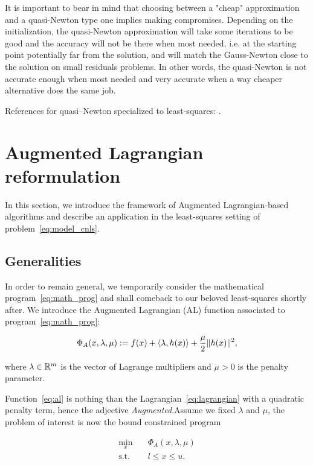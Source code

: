 \documentclass[10pt]{article}
\numberwithin{equation}{section}
\begin{document}
	 It is important to bear in mind that choosing between a "cheap" approximation and a quasi-Newton type one implies making compromises. Depending on the initialization, the quasi-Newton approximation will take some iterations to be good and the accuracy will not be there when most needed, i.e. at the starting point potentially far from the solution, and will match the Gauss-Newton close to the solution on small residuals problems. In other words, the quasi-Newton is not accurate enough when most needed and very accurate when a way cheaper alternative does the same job.
	 
	 References for quasi--Newton specialized to least-squares: \cite{dennisetal:1981,yabetakahashi}.
	 
	 \section{Augmented Lagrangian reformulation}\label{sec:about_al}
	 
	 In this section, we introduce the framework of Augmented Lagrangian-based algorithms and describe an application in the least-squares setting of problem~\eqref{eq:model_cnls}.
	 
	 \subsection{Generalities}
	 
	 In order to remain general, we temporarily consider the mathematical program~\eqref{eq:math_prog} and shall comeback to our beloved least-squares shortly after. 
	 We introduce the Augmented Lagrangian (AL) function associated to program~\eqref{eq:math_prog}:
	 
	 \begin{equation}
	 	\label{eq:al}
	 	\Phi_A(x,\lambda,\mu) := f(x) + \left\langle {\lambda} , {h(x)} \right\rangle + \dfrac{\mu}{2} \|h(x)\|^2,
	 \end{equation}
	 
	 where $\lambda\in {\mathbb{R}}^m$ is the vector of Lagrange multipliers and $\mu > 0$ is the penalty parameter.
	 
	 Function~\eqref{eq:al} is nothing than the Lagrangian~\eqref{eq:lagrangian} with a quadratic penalty term, hence the adjective \textit{Augmented}.Assume we fixed $\lambda$ and $\mu$, the problem of interest is now the bound constrained program
	 
	 \begin{equation}\label{eq:al_nlp}
	 	\begin{aligned}
	 		\min_x \quad & \Phi_A(x,\lambda,\mu) \\
	 		\text{s.t.} \quad & l \le x \le u.
	 	\end{aligned}
	 \end{equation}
	 
\end{document}
